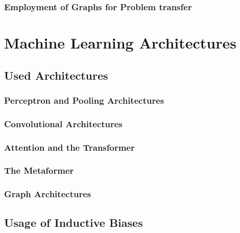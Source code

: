\documentclass[
headings=optiontohead,              %
12pt,                               %
DIV=13,                             %
twoside=false,                      %
open=right,                         %
BCOR=10mm,                          %
toc=bibliographynumbered            %
]{scrreport}
\begin{document}
        \subsection{Employment of Graphs for Problem transfer}
        \label{sec:theory-graphs}
        
        \FloatBarrier

\chapter{Machine Learning Architectures}
\label{sec:architectures}

    \section{Used Architectures}
    \label{sec:architectures-theory}
    
        \subsection{Perceptron and Pooling Architectures}
        \label{sec:architectures-perceptron}
        
        \FloatBarrier
        \subsection{Convolutional Architectures}
        \label{sec:architectures-convolution}
        
        \FloatBarrier
        \subsection{Attention and the Transformer}
        \label{sec:architectures-attention}
        
        \FloatBarrier
        \subsection{The Metaformer}
        \label{sec:architectures-metaformer}
        
        \FloatBarrier
        \subsection{Graph Architectures}
        \label{sec:architectures-graphs}
        
        \FloatBarrier
    \section{Usage of Inductive Biases}
    \label{sec:biases}
    
\end{document}
